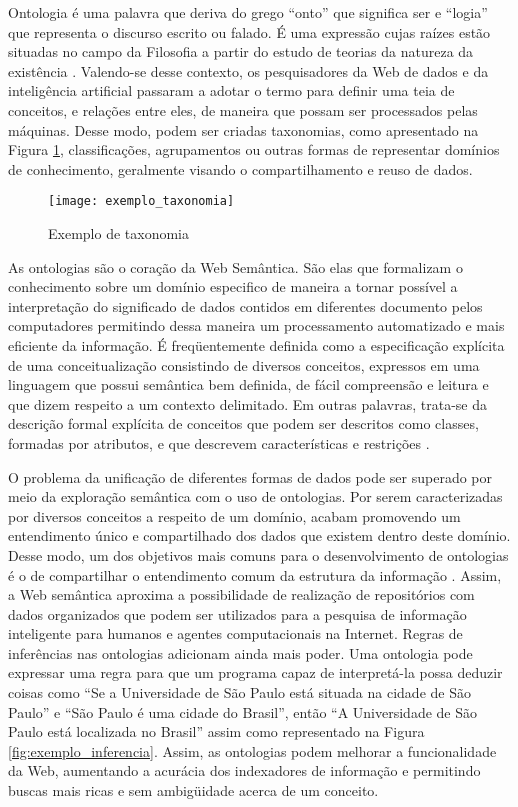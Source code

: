 Ontologia é uma palavra que deriva do grego ``onto'' que significa ser e ``logia'' que representa o discurso escrito ou falado. É uma expressão cujas raízes estão situadas no campo da Filosofia a partir do estudo de teorias da natureza da existência \citep{Berners-lee2001}. Valendo-se desse contexto, os pesquisadores da Web de dados e da inteligência artificial passaram a adotar o termo para definir uma teia de conceitos, e relações entre eles,  de maneira que possam ser processados pelas máquinas. Desse modo, podem ser criadas taxonomias,  como apresentado na Figura \ref{fig:exemplo_taxonomia}, classificações, agrupamentos ou outras formas de representar domínios de conhecimento, geralmente visando o compartilhamento e reuso de dados.

\begin{figure}[!ht]
  \centering
  \texttt{[image: exemplo\_taxonomia]} 
  \caption{Exemplo de taxonomia}
  \label{fig:exemplo_taxonomia} 
\end{figure}

As ontologias são o coração da Web Semântica. São elas que formalizam o conhecimento sobre um domínio especifico de maneira a tornar possível a interpretação do significado de dados contidos em diferentes documento pelos computadores \citep{Bienvenu2013} permitindo dessa maneira um processamento automatizado e mais eficiente da informação. É freqüentemente definida como a especificação explícita de uma conceitualização \citep{Gruber1993} consistindo de diversos conceitos, expressos em uma linguagem que possui semântica bem definida, de fácil compreensão e leitura \citep{Gali2004, Kabir2014} e que dizem respeito a um contexto delimitado. Em outras palavras, trata-se da descrição formal explícita de conceitos que podem ser descritos como classes, formadas por atributos, e que descrevem características e restrições \citep{Jain2011}.

O problema da unificação de diferentes formas de dados pode ser superado por meio da exploração semântica com o uso de ontologias. Por serem caracterizadas por diversos conceitos a respeito de um domínio, acabam promovendo um entendimento único e compartilhado dos dados que existem dentro deste domínio. Desse modo, um dos objetivos mais comuns para o desenvolvimento de ontologias é o de compartilhar o entendimento comum da estrutura da informação \citep{Noy2001}. Assim, a Web semântica aproxima a possibilidade de realização de repositórios com dados organizados que podem ser utilizados para a pesquisa de informação inteligente para humanos e agentes computacionais \citep{Gali2004} na Internet. Regras de inferências nas ontologias adicionam ainda mais poder. Uma ontologia pode expressar uma regra para que um programa capaz de interpretá-la possa deduzir coisas como ``Se a Universidade de São Paulo está situada na cidade de São Paulo'' e ``São Paulo é uma cidade do Brasil'', então ``A Universidade de São Paulo está localizada no Brasil'' assim como representado na Figura \ref{fig:exemplo_inferencia}. Assim, as ontologias podem melhorar a funcionalidade da Web, aumentando a acurácia dos indexadores de informação e permitindo buscas mais ricas e sem ambigüidade acerca de um conceito.

